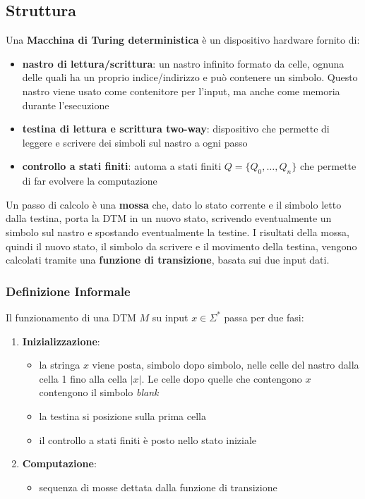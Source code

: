 \subsection{Struttura}
Una \textbf{Macchina di Turing deterministica} è un dispositivo hardware fornito di: 
\begin{itemize}
	\item \textbf{nastro di lettura/scrittura}: un nastro infinito formato da celle, ognuna delle quali ha un proprio indice/indirizzo e può contenere un simbolo. Questo nastro viene usato come contenitore per l'input, ma anche come memoria durante l'esecuzione
	\item \textbf{testina di lettura e scrittura two-way}: dispositivo che permette di leggere e scrivere dei simboli sul nastro a ogni passo
	\item \textbf{controllo a stati finiti}: automa a stati finiti $Q = \{Q_0, \dots, Q_n\}$ che permette di far evolvere la computazione
\end{itemize}

Un passo di calcolo è una \textbf{mossa} che, dato lo stato corrente e il simbolo letto dalla testina, porta la DTM in un nuovo stato, scrivendo eventualmente un simbolo sul nastro e spostando eventualmente la testine. I risultati della mossa, quindi il nuovo stato, il simbolo da scrivere e il movimento della testina, vengono calcolati tramite una \textbf{funzione di transizione}, basata sui due input dati.\\

\subsubsection{Definizione Informale}

Il funzionamento di una DTM $M$ su input $x \in \Sigma^\ast$ passa per due fasi:
\begin{enumerate}
	\item \textbf{Inizializzazione}:
	\begin{itemize}
		\item la stringa $x$ viene posta, simbolo dopo simbolo, nelle celle del nastro dalla cella 1 fino alla cella $|x|$. Le celle dopo quelle che contengono $x$ contengono il simbolo \textit{blank}
		\item la testina si posizione sulla prima cella
		\item il controllo a stati finiti è posto nello stato iniziale
	\end{itemize}
	\item \textbf{Computazione}:
	\begin{itemize}
		\item sequenza di mosse dettata dalla funzione di transizione
	\end{itemize}
\end{enumerate}

